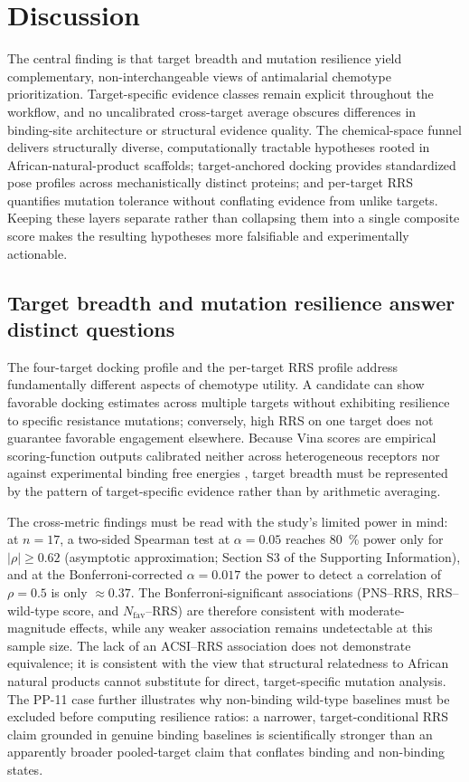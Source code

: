 \documentclass[11pt,a4paper]{article}
\begin{document}
	\section{Discussion}\label{sec:discussion}
	The central finding is that target breadth and mutation resilience yield complementary, non-interchangeable views of antimalarial chemotype prioritization. Target-specific evidence classes remain explicit throughout the workflow, and no uncalibrated cross-target average obscures differences in binding-site architecture or structural evidence quality. The chemical-space funnel delivers structurally diverse, computationally tractable hypotheses rooted in African-natural-product scaffolds; target-anchored docking provides standardized pose profiles across mechanistically distinct proteins; and per-target RRS quantifies mutation tolerance without conflating evidence from unlike targets. Keeping these layers separate rather than collapsing them into a single composite score makes the resulting hypotheses more falsifiable and experimentally actionable.
	
	\subsection{Target breadth and mutation resilience answer distinct questions}\label{sec:disc_breadth}
	The four-target docking profile and the per-target RRS profile address fundamentally different aspects of chemotype utility. A candidate can show favorable docking estimates across multiple targets without exhibiting resilience to specific resistance mutations; conversely, high RRS on one target does not guarantee favorable engagement elsewhere. Because Vina scores are empirical scoring-function outputs calibrated neither across heterogeneous receptors nor against experimental binding free energies \cite{Quiroga2016}, target breadth must be represented by the pattern of target-specific evidence rather than by arithmetic averaging.
	
	The cross-metric findings must be read with the study's limited power in mind: at $n=\num{17}$, a two-sided Spearman test at $\alpha=\num{0.05}$ reaches \qty{80}{\percent} power only for $|\rho|\geq\num{0.62}$ (asymptotic approximation; Section S3 of the Supporting Information), and at the Bonferroni-corrected $\alpha=\num{0.017}$ the power to detect a correlation of $\rho=\num{0.5}$ is only $\approx\num{0.37}$. The Bonferroni-significant associations (PNS--RRS, RRS--wild-type score, and $N_{\mathrm{fav}}$--RRS) are therefore consistent with moderate-magnitude effects, while any weaker association remains undetectable at this sample size. The lack of an ACSI--RRS association does not demonstrate equivalence; it is consistent with the view that structural relatedness to African natural products cannot substitute for direct, target-specific mutation analysis. The PP-11 case further illustrates why non-binding wild-type baselines must be excluded before computing resilience ratios: a narrower, target-conditional RRS claim grounded in genuine binding baselines is scientifically stronger than an apparently broader pooled-target claim that conflates binding and non-binding states.
	
\end{document}
